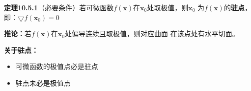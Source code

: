 {\bf 定理10.5.1}（必要条件）若可微函数$f(\bm{x})$在$\bm{x}_0$处取极值，则$\bm{x}_0$
为$f(\bm{x})$的{\bf 驻点}，即：$\bigtriangledown f(\bm{x}_0)=0$

{\bf 推论：}若$f(\bm{x})$在$\bm{x}_0$处偏导连续且取极值，则对应曲面
在该点处有水平切面。

\begin{shaded}
	{\bf 关于驻点：}
	
	\begin{itemize}
	  \item 可微函数的极值点必是驻点
	  \item 驻点未必是极值点 
	\end{itemize}
	
	\begin{center}
		\quad
	\end{center}
\end{shaded}

